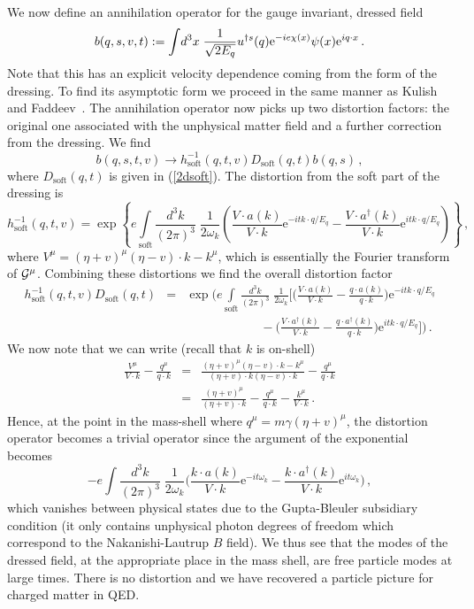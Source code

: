 \documentclass[12pt,a4paper]{article}
\newcommand{\ad}{{a^{\dag}}}
\newcommand{\cd}{\cdot}
\newcommand{\ecd}{{\cdot}}
\newcommand{\G}{{\cal G}}
\newcommand{\ee}{\mathrm{e}}
\newcommand{\soft}{{\mathrm{soft}}}
\newcommand{\intx}{\int\!d^3x\;}
\newcommand{\intk}{\int\!\frac{d^3k}{(2\pi)^3}\;}
\newcommand{\intks}{\int\limits_{\soft}\!\frac{d^3k}{(2\pi)^3}\;}
\begin{document}
We now define an annihilation operator for the gauge invariant, dressed  field
\begin{equation}\label{2bgood}
  b(q,s,v,t):=\intx\frac1{\sqrt{2E_{\smash{q}}}}u^{\dag s}(q)\ee^{-ie\chi(x)}
  \psi(x)\ee^{iq\ecd
  x}\,.
\end{equation}
Note that this has an explicit velocity dependence coming from the
form of the dressing. To find its asymptotic form we proceed in the
same manner as Kulish and Faddeev~\cite{kulish:1970}. The
annihilation operator now picks up two distortion factors: the
original one associated with the unphysical matter field and a further
correction from the dressing. We find
\begin{equation}\label{3bexp}
  b(q,s,t,v)\to h^{-1}_\soft(q,t,v)D_\soft(q,t)b(q,s)\,,
\end{equation}
where  $D_\soft(q,t)$ is given in (\ref{2dsoft}). The distortion from
the soft part of the
dressing is
\begin{equation}\label{3ddress}
  h^{-1}_{\soft}(q,t,v)=\exp\left\{e\!\!\!\intks\frac1{2\omega_k}
  \left(
  \frac{V\cd a(k)}{V\cd k}\ee^{-itk\ecd q/E_q}-
\frac{V\cd \ad(k)}{V\cd k}\ee^{itk\ecd q/E_q}
  \right)\right\}\,,
\end{equation}
where $ V^\mu=(\eta+v)^\mu(\eta-v)\cd k-k^\mu$, which is essentially
the Fourier transform of $\G^\mu$.
Combining these  distortions we find the overall distortion factor
\begin{eqnarray}
 h^{-1}_\soft(q,t,v)D_{\soft}(q,t)&=&\exp\Bigg(e\!\!\intks\frac1{2\omega_k}
  \bigg[\bigg(
  \frac{V\cd a(k)}{V\cd k}-\frac{q\cd a(k)}{q\cd k}\bigg)\ee^{-itk\ecd q/E_q}\nonumber\\
  &&\qquad\qquad\qquad-
\bigg(\frac{V\cd \ad(k)}{V\cd k}-\frac{q\cd \ad(k)}{q\cd k}\bigg)\ee^{itk\ecd q/E_q}
  \bigg]\Bigg)\,.
\end{eqnarray}
We now note that we can write (recall that $k$ is on-shell)
\begin{eqnarray}
\frac{V^\mu}{V\cd k}-\frac{q^\mu}{q\cd k}&=& \frac{(\eta+v)^\mu(\eta-v)\cd
k-k^\mu}{(\eta+v)\cd k(\eta-v)\cd k}-\frac{q^\mu}{q\cd k}\nonumber\\
&=&\frac{(\eta+v)^\mu}{(\eta+v)\cd k}-\frac{q^\mu}{q\cd k}-\frac{k^\mu}{V\cd k}\,.
\end{eqnarray}
Hence, at the point in the mass-shell where $q^\mu=m\gamma(\eta+v)^\mu$, the
distortion operator becomes a trivial operator since the argument of
the exponential becomes
\begin{equation}
-e\intk\frac1{2\omega_k}
 \bigg(
  \frac{k\cd a(k)}{V\cd k}\ee^{-it\omega_k}
  -\frac{k\cd a^\dag(k)}{V\cd k}
  \ee^{it\omega_k}\bigg)\,,
\end{equation}
which vanishes between physical states due to the Gupta-Bleuler
subsidiary condition (it only contains unphysical photon degrees of
freedom which correspond to the Nakanishi-Lautrup $B$ field).
We thus see that the modes of
the dressed field, at the appropriate place in the mass shell, are
free particle modes at large times. There is no distortion and we
have recovered a particle picture for charged matter in QED.
\end{document}

